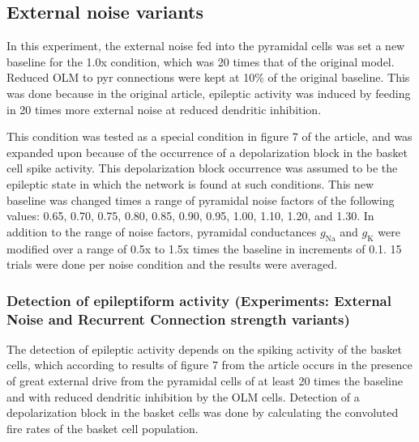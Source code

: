 \subsection{External noise variants}
In this experiment, the external noise fed into the pyramidal cells was set a
new baseline for the 1.0x condition, which was 20 times that of the original
\textcite{sanjayImpairedDendriticInhibition2015} model. Reduced OLM to pyr
connections were kept at 10\% of the original baseline. This was done because
in the original article, epileptic activity was induced by feeding in 20 times
more external noise at reduced dendritic inhibition.

This condition was tested as a special condition in figure 7 of the article,
and was expanded upon because of the occurrence of a depolarization block in
the basket cell spike activity. This depolarization block occurrence was
assumed to be the epileptic state in which the network is found at such
conditions. This new baseline was changed times a range of pyramidal noise
factors of the following values: 0.65, 0.70, 0.75, 0.80, 0.85, 0.90, 0.95,
1.00, 1.10, 1.20, and 1.30. In addition to the range of noise factors,
pyramidal conductances \(g_{\text{Na}}\) and \(g_{\text{K}}\) were modified
over a range of 0.5x to 1.5x times the baseline in increments of 0.1. 15 trials
were done per noise condition and the results were averaged.

\subsubsection{Detection of epileptiform activity (Experiments: External Noise and Recurrent Connection strength variants)}
The detection of epileptic activity depends on the spiking activity of the
basket cells, which according to results of figure 7 from the
\textcite{sanjayImpairedDendriticInhibition2015} article occurs in the presence
of great external drive from the pyramidal cells of at least 20 times the
baseline and with reduced dendritic inhibition by the OLM cells. Detection of a
depolarization block in the basket cells was done by calculating the convoluted
fire rates of the basket cell population.


